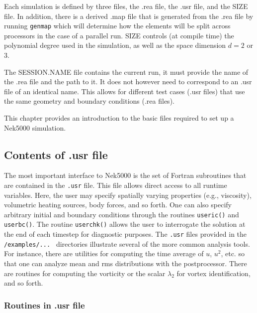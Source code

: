 

Each simulation is defined by three files, the .rea file, the .usr file,
and the SIZE file.  In addition, there is a derived .map file that is
generated from the .rea file by running {\tt genmap} which will determine how the elements will be split across processors in the case of a parallel run.
SIZE controls (at compile time) the polynomial degree used in the simulation,
as well as the space dimension $d=2$ or 3.

The SESSION.NAME file contains the current run, it must provide the name of the .rea file and the path to it.  It does not however need to correspond to an .usr file of an identical name. This allows for different test cases (.usr files) that use the same geometry and boundary conditions (.rea files).

This chapter provides an introduction to the basic files required
to set up a Nek5000 simulation.

\subsection{Contents of .usr file}

The most important interface to Nek5000 is the
set of Fortran subroutines that are contained in the {\tt .usr} file.
This file allows direct access to all runtime variables.
Here, the user may specify spatially varying properties
(e.g., viscosity), volumetric heating sources, body forces, and so forth.
One can also specify arbitrary initial and boundary conditions through
the routines {\tt useric()} and {\tt userbc()}.
The routine {\tt userchk()} allows the user to interrogate the solution
at the end of each timestep for diagnostic purposes.   The {\tt .usr}
files provided in the {\tt /examples/... } directories illustrate
several of the more common analysis tools.  For instance, there are utilities
for computing the time average of $u$, $u^2$, etc. so that one can
analyze mean and rms distributions with the postprocessor.  There are
routines for computing the vorticity or the scalar $\lambda_2$ 
for vortex identification, and so forth.


\subsubsection*{Routines in .usr file}

